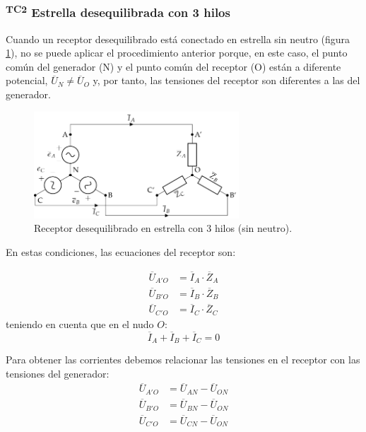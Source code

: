 \subsubsection{\textsuperscript{TC2} Estrella desequilibrada con 3 hilos}
\label{ref:estrella-des-3h}

Cuando un receptor desequilibrado está conectado en estrella sin neutro (figura \ref{fig:estrella-des-3h}), no se puede aplicar el procedimiento anterior porque, en este caso, el punto común del generador (N) y el punto común del receptor (O) están a diferente potencial, $\overline{U}_N \neq \overline{U}_{O}$ y, por tanto, las tensiones del receptor son diferentes a las del generador.

\begin{figure}
  \centering
  \includegraphics[height=4cm]{../figs/EstrellaDesequilibrado_SinNeutro.pdf}
  \caption{Receptor desequilibrado en estrella con 3 hilos (sin neutro).}
  \label{fig:estrella-des-3h}
\end{figure}

En estas condiciones, las ecuaciones del receptor son:

\begin{align*}
  \overline{U}_{A'O} &= \overline{I}_A \cdot \overline{Z}_A\\
  \overline{U}_{B'O} &= \overline{I}_B \cdot \overline{Z}_B\\
  \overline{U}_{C'O} &= \overline{I}_C \cdot \overline{Z}_C
\end{align*}
teniendo en cuenta que en el nudo \(O\):
\[
  \overline{I}_A + \overline{I}_B + \overline{I}_C = 0
\]

Para obtener las corrientes debemos relacionar las tensiones en el receptor con las tensiones del generador:
\begin{align*}
  \overline{U}_{A'O} &= \overline{U}_{AN} - \overline{U}_{ON}\\
  \overline{U}_{B'O} &= \overline{U}_{BN} - \overline{U}_{ON}\\
  \overline{U}_{C'O} &= \overline{U}_{CN} - \overline{U}_{ON}
\end{align*}

